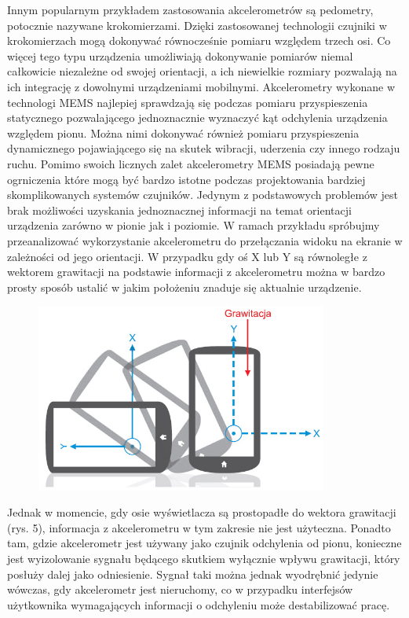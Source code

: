 Innym popularnym przykładem zastosowania akcelerometrów są pedometry, potocznie 
nazywane krokomierzami. Dzięki zastosowanej technologii czujniki w krokomierzach
mogą dokonywać równocześnie pomiaru względem trzech osi. Co więcej tego typu
urządzenia umożliwiają dokonywanie pomiarów niemal całkowicie niezależne od
swojej orientacji, a ich niewielkie rozmiary pozwalają na ich integrację z 
dowolnymi urządzeniami mobilnymi. Akcelerometry wykonane w technologi MEMS
najlepiej sprawdzają się  podczas pomiaru przyspieszenia statycznego
pozwalającego jednoznacznie wyznaczyć kąt odchylenia urządzenia względem pionu. 
Można nimi dokonywać również pomiaru przyspieszenia dynamicznego pojawiającego 
się na skutek wibracji, uderzenia czy innego rodzaju ruchu. Pomimo swoich
licznych zalet akcelerometry MEMS posiadają pewne ogrniczenia które mogą być
bardzo istotne podczas projektowania bardziej skomplikowanych systemów
czujników. Jedynym z podstawowych problemów jest brak możliwości uzyskania
jednoznacznej informacji na temat orientacji urządzenia zarówno w pionie jak i
poziomie. W ramach przykładu spróbujmy przeanalizować wykorzystanie
akcelerometru do przełączania widoku na ekranie w zależności od jego orientacji.  W przypadku
gdy oś X lub Y są równoległe z wektorem grawitacji na podstawie informacji z
akcelerometru można w bardzo prosty sposób ustalić w jakim położeniu znaduje
się aktualnie urządzenie. 

\begin{figure}[h!]
 \centering
 \includegraphics[height=62mm]{../images/ch04/acc_orientation.png}
 \caption{}
 \label{fig:AkcelerometrOrientation}
\end{figure}
Jednak w momencie, gdy osie wyświetlacza są prostopadłe do wektora grawitacji
(rys. 5), informacja z akcelerometru w tym zakresie nie jest użyteczna. Ponadto
tam, gdzie akcelerometr jest używany jako czujnik odchylenia od pionu, konieczne
jest wyizolowanie sygnału będącego skutkiem wyłącznie wpływu grawitacji, który
posłuży dalej jako odniesienie. Sygnał taki można jednak wyodrębnić jedynie
wówczas, gdy akcelerometr jest nieruchomy, co w przypadku interfejsów użytkownika
wymagających informacji o odchyleniu może destabilizować pracę.

